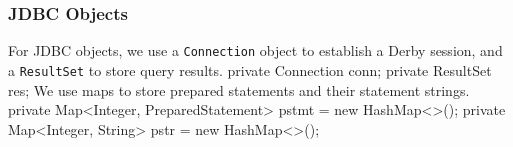 \documentclass{article}
\def\nwendcode{\endtrivlist \endgroup}
\let\nwdocspar=\par
\theoremstyle{definition}
\begin{document}
\subsubsection{JDBC Objects}
\label{sec:jdbc-objects}
For JDBC objects, we use a {\tt{}Connection} object to establish a Derby session,
and a {\tt{}ResultSet} to store query results.
\nwenddocs{}\endmoddef{}
private Connection conn;
private ResultSet res;
\eatline
{}\nwendcode{}We use maps to store prepared statements and their statement strings.
\nwenddocs{}\plusendmoddef
private Map<Integer, PreparedStatement> pstmt = new HashMap<>();
private Map<Integer, String> pstr = new HashMap<>();
\eatline
{}\nwendcode{}\nwdocspar
\end{document}
